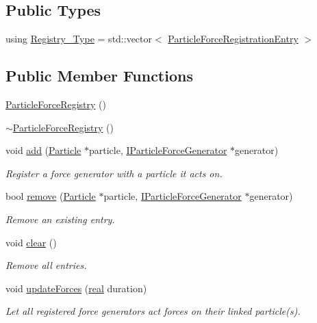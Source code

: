 \subsection*{Public Types}
\begin{DoxyCompactItemize}
\item 
using \mbox{\hyperlink{classr3_1_1_particle_force_registry_ae769e654dbf539cf09c514e47768498c}{Registry\+\_\+\+Type}} = std\+::vector$<$ \mbox{\hyperlink{structr3_1_1_particle_force_registry_1_1_particle_force_registration_entry}{Particle\+Force\+Registration\+Entry}} $>$
\end{DoxyCompactItemize}
\subsection*{Public Member Functions}
\begin{DoxyCompactItemize}
\item 
\mbox{\hyperlink{classr3_1_1_particle_force_registry_a4ca245fb0538dbfb0c04ca49a3a226b6}{Particle\+Force\+Registry}} ()
\item 
\mbox{\hyperlink{classr3_1_1_particle_force_registry_aa1fb5af3138a91474810858e52f5a21c}{$\sim$\+Particle\+Force\+Registry}} ()
\item 
void \mbox{\hyperlink{classr3_1_1_particle_force_registry_a11cb053992645af9af2ccd5f98783cae}{add}} (\mbox{\hyperlink{classr3_1_1_particle}{Particle}} $\ast$particle, \mbox{\hyperlink{classr3_1_1_i_particle_force_generator}{I\+Particle\+Force\+Generator}} $\ast$generator)
\begin{DoxyCompactList}\small\item\em Register a force generator with a particle it acts on. \end{DoxyCompactList}\item 
bool \mbox{\hyperlink{classr3_1_1_particle_force_registry_aa4aa0458e212f63a7a9248318fee1016}{remove}} (\mbox{\hyperlink{classr3_1_1_particle}{Particle}} $\ast$particle, \mbox{\hyperlink{classr3_1_1_i_particle_force_generator}{I\+Particle\+Force\+Generator}} $\ast$generator)
\begin{DoxyCompactList}\small\item\em Remove an existing entry. \end{DoxyCompactList}\item 
void \mbox{\hyperlink{classr3_1_1_particle_force_registry_ac49c38fa041447278c56e68c6e796d77}{clear}} ()
\begin{DoxyCompactList}\small\item\em Remove all entries. \end{DoxyCompactList}\item 
void \mbox{\hyperlink{classr3_1_1_particle_force_registry_aff16efc19c65d28e39a38cbc936ede2a}{update\+Forces}} (\mbox{\hyperlink{namespacer3_ab2016b3e3f743fb735afce242f0dc1eb}{real}} duration)
\begin{DoxyCompactList}\small\item\em Let all registered force generators act forces on their linked particle(s). \end{DoxyCompactList}\end{DoxyCompactItemize}

